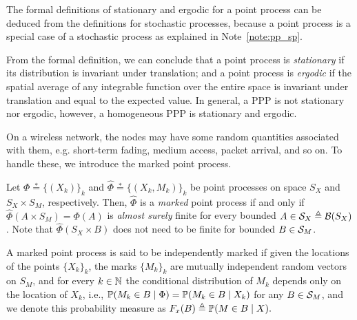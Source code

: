
The formal definitions of stationary and ergodic for a point process can be deduced from the definitions for stochastic processes, because a point process is a special case of a stochastic process as explained in Note~\ref{note:pp_sp}.

From the formal definition, we can conclude that a point process is \textit{stationary} if its distribution is invariant under translation; and a point process is \textit{ergodic} if the spatial average of any integrable function over the entire space is invariant under translation and equal to the expected value.
%
In general, a PPP is not stationary nor ergodic, however, a homogeneous PPP is stationary and ergodic.

On a wireless network, the nodes may have some random quantities associated with them, e.g. short-term fading, medium access, packet arrival, and so on.
%
To handle these, we introduce the marked point process.
%
\begin{definition}
    Let $\Phi\stackrel{*}{=}\{(X_k)\}_k$ and $\hat\Phi\stackrel{*}{=}\{(X_k,M_k)\}_k$ be point processes on space $S_X$ and $S_X\times S_M$, respectively.
    Then, $\hat\Phi$ is a \textit{marked} point process if and only if $\hat\Phi(A\times S_M) = \Phi(A)$ is \textit{almost surely} finite for every bounded $A\in \cal{S}_X \triangleq \cal{B}(S_X)$. Note that $\hat\Phi(S_X \times B)$ does not need to be finite for bounded $B\in\cal{S}_M$.
    
    A marked point process is said to be independently marked if given the locations of the points $\{X_k\}_k$, the marks $\{M_k\}_k$ are mutually independent random vectors on $S_M$, and for every $k\in\N$ the conditional distribution of $M_k$ depends only on the location of $X_k$, i.e., $\P(M_k\in B \mid \Phi) = \P(M_k\in B\mid X_k)$ for any $B\in\cal{S}_M$, and we denote this probability measure as
    $
        F_x(B) \triangleq \P(M\in B\mid X).
    $
\end{definition}


